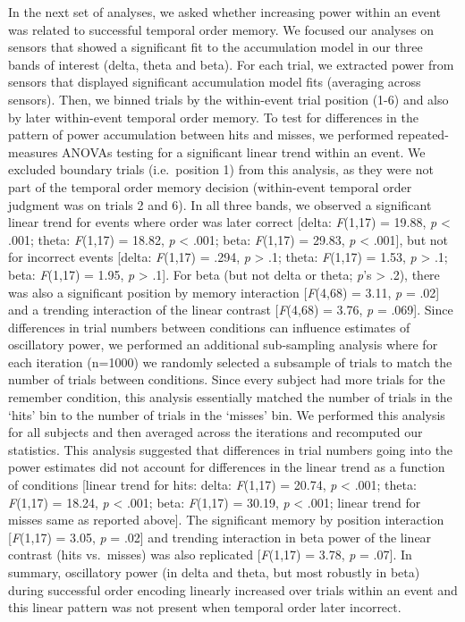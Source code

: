 In the next set of analyses, we asked whether increasing power within an
event was related to successful temporal order memory. We focused our
analyses on sensors that showed a significant fit to the accumulation
model in our three bands of interest (delta, theta and beta). For each
trial, we extracted power from sensors that displayed significant
accumulation model fits (averaging across sensors). Then, we binned
trials by the within-event trial position (1-6) and also by later
within-event temporal order memory. To test for differences in the
pattern of power accumulation between hits and misses, we performed
repeated-measures ANOVAs testing for a significant linear trend within
an event. We excluded boundary trials (i.e.~position 1) from this
analysis, as they were not part of the temporal order memory decision
(within-event temporal order judgment was on trials 2 and 6). In all
three bands, we observed a significant linear trend for events where
order was later correct {[}delta: \emph{F}(1,17) = 19.88, \emph{p}
\textless{} .001; theta: \emph{F}(1,17) = 18.82, \emph{p} \textless{}
.001; beta: \emph{F}(1,17) = 29.83, \emph{p} \textless{} .001{]}, but
not for incorrect events {[}delta: \emph{F}(1,17) = .294, \emph{p}
\textgreater{} .1; theta: \emph{F}(1,17) = 1.53, \emph{p} \textgreater{}
.1; beta: \emph{F}(1,17) = 1.95, \emph{p} \textgreater{} .1{]}. For beta
(but not delta or theta; \emph{p}'s \textgreater{} .2), there was also a
significant position by memory interaction {[}\emph{F}(4,68) = 3.11,
\emph{p} = .02{]} and a trending interaction of the linear contrast
{[}\emph{F}(4,68) = 3.76, \emph{p} = .069{]}. Since differences in trial
numbers between conditions can influence estimates of oscillatory power,
we performed an additional sub-sampling analysis where for each
iteration (n=1000) we randomly selected a subsample of trials to match
the number of trials between conditions. Since every subject had more
trials for the remember condition, this analysis essentially matched the
number of trials in the `hits' bin to the number of trials in the
`misses' bin. We performed this analysis for all subjects and then
averaged across the iterations and recomputed our statistics. This
analysis suggested that differences in trial numbers going into the
power estimates did not account for differences in the linear trend as a
function of conditions {[}linear trend for hits: delta: \emph{F}(1,17) =
20.74, \emph{p} \textless{} .001; theta: \emph{F}(1,17) = 18.24,
\emph{p} \textless{} .001; beta: \emph{F}(1,17) = 30.19, \emph{p}
\textless{} .001; linear trend for misses same as reported above{]}. The
significant memory by position interaction {[}\emph{F}(1,17) = 3.05,
\emph{p} = .02{]} and trending interaction in beta power of the linear
contrast (hits vs.~misses) was also replicated {[}\emph{F}(1,17) = 3.78,
\emph{p} = .07{]}. In summary, oscillatory power (in delta and theta,
but most robustly in beta) during successful order encoding linearly
increased over trials within an event and this linear pattern was not
present when temporal order later incorrect.

